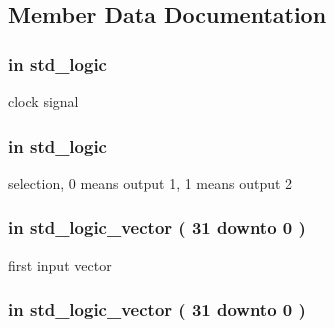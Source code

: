 \subsection{\-Member \-Data \-Documentation}
\hypertarget{class_m_u_x_a70f7f9ef1e412f6da35c2b9e17540895}{
\subsubsection[{clk}]{ {\bfseries in } {\bfseries std\-\_\-logic } }}\label{class_m_u_x_a70f7f9ef1e412f6da35c2b9e17540895}


clock signal 

\hypertarget{class_m_u_x_a9819d657d3d033c5c4ffe99e31b79bb2}{
\subsubsection[{selector}]{ {\bfseries in } {\bfseries std\-\_\-logic } }}\label{class_m_u_x_a9819d657d3d033c5c4ffe99e31b79bb2}


selection, 0 means output 1, 1 means output 2 

\hypertarget{class_m_u_x_adbc4a8307f6b8e70f215db699745f990}{
\subsubsection[{vector\-\_\-in\-\_\-1}]{ {\bfseries in } {\bfseries std\-\_\-logic\-\_\-vector (   31    downto    0  ) } }}\label{class_m_u_x_adbc4a8307f6b8e70f215db699745f990}


first input vector 

\hypertarget{class_m_u_x_aa66f7828cd4605fa3a26337c456221b1}{
\subsubsection[{vector\-\_\-in\-\_\-2}]{ {\bfseries in } {\bfseries std\-\_\-logic\-\_\-vector (   31    downto    0  ) } }}\label{class_m_u_x_aa66f7828cd4605fa3a26337c456221b1}


